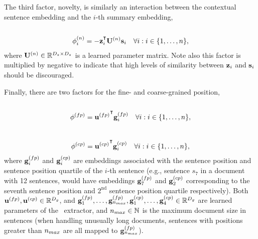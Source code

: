 The third factor, novelty, is similarly an interaction between the contextual
sentence embedding and the $i$-th summary embedding,\\

\\[-40pt]
\begin{align}
    \srNoveltyFactor_i &= -\srHid_i^\T \srNoveltyWeight \srSum_i
    & \forall i : i \in \{1,\ldots,\docSize\},
    \label{eq:srnov} 
\end{align}
where $\mathbf{U}^{(n)} \in \mathbb{R}^{{D_z} \times {D_z}}$ is a learned
parameter matrix. Note also this factor is multiplied by negative to indicate
that high levels of similarity between $\mathbf{z}_i$ and $\mathbf{s}_i$ should be
discouraged. 



Finally, there are two factors for the fine- and coarse-grained position,\\

\\[-40pt]
\begin{align}
    \srFinePositionFactor& = {\srFinePositionWeight}^\T \srFinePositionEmb_i
& \forall i : i \in \{1,\ldots,\docSize\}, 
\end{align}
\\[-40pt]
\begin{align}
    \srCoarsePositionFactor& = {\srCoarsePositionWeight}^\T \srCoarsePositionEmb_i & \forall i : i \in \{1,\ldots,\docSize\}, 
\end{align}
where $\mathbf{g}^{(fp)}_i$ and $\mathbf{g}^{(cp)}_i$ are embeddings
associated with the sentence position and sentence position quartile of the
$i$-th sentence (e.g., sentence $s_7$ in a document with 12 sentences, would
have embeddings $\mathbf{g}^{(fp)}_7$ and $\mathbf{g}^{(cp)}_2$
corresponding to the seventh sentence position and $2^\textrm{nd}$ sentence
position quartile respectively).  Both $\mathbf{u}^{(fp)},
\mathbf{u}^{(cp)} \in \mathbb{R}^{{D_g}}$, and
$\mathbf{g}^{(fp)}_1,\ldots,\mathbf{g}^{(fp)}_{n_{max}},\mathbf{g}^{(cp)}_1,\ldots,\mathbf{g}^{(cp)}_4
\in \mathbb{R}^{{D_g}}$ are learned parameters of the \srext~extractor, and
${n_{max}}\in\mathbb{N}$ is the maximum document size in sentences (when
handling unusually long documents, sentences with positions greater than
${n_{max}}$ are all mapped to $\mathbf{g}^{(fp)}_{n_{max}}$).

